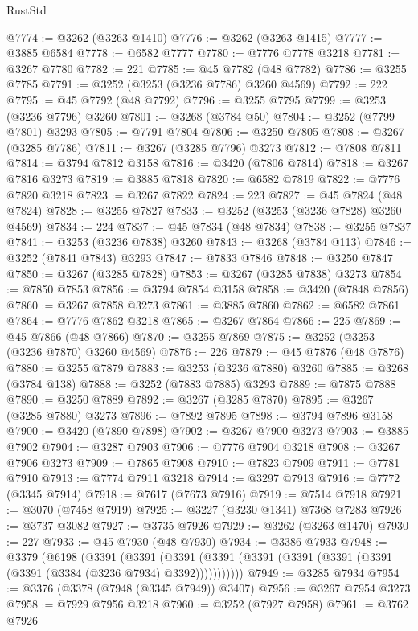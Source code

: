 \begin{lexlean}{RustStd}
\begin{coremodule}
{\begin{coremodule}
{{{{{{{{{{{{{{{{{{{{{{{{{{{{{{{{{{{{{{{@7774 := @3262 (@3263 @1410)
@7776 := @3262 (@3263 @1415)
@7777 := @3885 @6584
@7778 := @6582 @7777
@7780 := @7776 @7778 @3218
@7781 := @3267 @7780
@7782 := 221
@7785 := @45 @7782 (@48 @7782)
@7786 := @3255 @7785
@7791 := @3252 (@3253 (@3236 @7786) @3260 @4569)
@7792 := 222
@7795 := @45 @7792 (@48 @7792)
@7796 := @3255 @7795
@7799 := @3253 (@3236 @7796) @3260
@7801 := @3268 (@3784 @50)
@7804 := @3252 (@7799 @7801) @3293
@7805 := @7791 @7804
@7806 := @3250 @7805
@7808 := @3267 (@3285 @7786)
@7811 := @3267 (@3285 @7796) @3273
@7812 := @7808 @7811
@7814 := @3794 @7812 @3158
@7816 := @3420 (@7806 @7814)
@7818 := @3267 @7816 @3273
@7819 := @3885 @7818
@7820 := @6582 @7819
@7822 := @7776 @7820 @3218
@7823 := @3267 @7822
@7824 := 223
@7827 := @45 @7824 (@48 @7824)
@7828 := @3255 @7827
@7833 := @3252 (@3253 (@3236 @7828) @3260 @4569)
@7834 := 224
@7837 := @45 @7834 (@48 @7834)
@7838 := @3255 @7837
@7841 := @3253 (@3236 @7838) @3260
@7843 := @3268 (@3784 @113)
@7846 := @3252 (@7841 @7843) @3293
@7847 := @7833 @7846
@7848 := @3250 @7847
@7850 := @3267 (@3285 @7828)
@7853 := @3267 (@3285 @7838) @3273
@7854 := @7850 @7853
@7856 := @3794 @7854 @3158
@7858 := @3420 (@7848 @7856)
@7860 := @3267 @7858 @3273
@7861 := @3885 @7860
@7862 := @6582 @7861
@7864 := @7776 @7862 @3218
@7865 := @3267 @7864
@7866 := 225
@7869 := @45 @7866 (@48 @7866)
@7870 := @3255 @7869
@7875 := @3252 (@3253 (@3236 @7870) @3260 @4569)
@7876 := 226
@7879 := @45 @7876 (@48 @7876)
@7880 := @3255 @7879
@7883 := @3253 (@3236 @7880) @3260
@7885 := @3268 (@3784 @138)
@7888 := @3252 (@7883 @7885) @3293
@7889 := @7875 @7888
@7890 := @3250 @7889
@7892 := @3267 (@3285 @7870)
@7895 := @3267 (@3285 @7880) @3273
@7896 := @7892 @7895
@7898 := @3794 @7896 @3158
@7900 := @3420 (@7890 @7898)
@7902 := @3267 @7900 @3273
@7903 := @3885 @7902
@7904 := @3287 @7903
@7906 := @7776 @7904 @3218
@7908 := @3267 @7906 @3273
@7909 := @7865 @7908
@7910 := @7823 @7909
@7911 := @7781 @7910
@7913 := @7774 @7911 @3218
@7914 := @3297 @7913
@7916 := @7772 (@3345 @7914)
@7918 := @7617 (@7673 @7916)
@7919 := @7514 @7918
@7921 := @3070 (@7458 @7919)
@7925 := @3227 (@3230 @1341) @7368 @7283
@7926 := @3737 @3082
@7927 := @3735 @7926
@7929 := @3262 (@3263 @1470)
@7930 := 227
@7933 := @45 @7930 (@48 @7930)
@7934 := @3386 @7933
@7948 := @3379
    (@6198
      (@3391
        (@3391
          (@3391 (@3391 (@3391 (@3391 (@3391 (@3391 (@3391 (@3384 (@3236 @7934) @3392)))))))))))
@7949 := @3285 @7934
@7954 := @3376 (@3378 (@7948 (@3345 @7949)) @3407)
@7956 := @3267 @7954 @3273
@7958 := @7929 @7956 @3218
@7960 := @3252 (@7927 @7958)
@7961 := @3762 @7926
}}}}}}}}}}}}}}}}}}}}}}}}}}}}}}}}}}}}}}}
\end{coremodule}}
\end{coremodule}
\end{lexlean}
